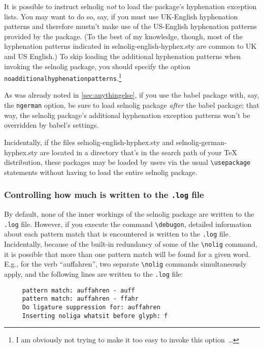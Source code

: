\documentclass[12pt]{article}
\newcommand{\pkg}[1]{\textsf{#1}}
\newcommand{\opt}[1]{\texttt{#1}}
\newcommand{\cmmd}[1]{\texttt{\textbackslash #1}}
\begin{document}
It is possible to instruct \pkg{selnolig} \emph{not} to load the package's hyphenation exception lists. You may want to do so, say, if you must use UK-English hyphenation patterns and therefore mustn't make use of the US-English hyphenation patterns provided by the package. (To the best of my knowledge, though, most of the hyphenation patterns indicated in \pkg{selnolig-english-hyphex.sty} are common to UK and US English.) To skip loading the additional hyphenation patterns when invoking the \pkg{selnolig} package, you should specify the option \opt{noadditional\-hyphen\-a\-tion\-patterns}.\footnote{I am obviously not trying to make it too easy to invoke this option~\dots}

As was already noted in \cref{sec:anythingelse}, if you use the \pkg{babel} package with, say, the \opt{ngerman} option, be sure to load \pkg{selnolig} package \emph{after} the \pkg{babel} package; that way, the \pkg{selnolig} package's additional hyphenation exception patterns won't be overridden by \pkg{babel}'s settings.

Incidentally, if the files \pkg{selnolig-english-hyphex.sty} and \pkg{selnolig-german-hyphex.sty} are located in a directory that's in the search path of your TeX distribution, these packages may be loaded by users via the usual \cmmd{usepackage} statements without having to load the entire \pkg{selnolig} package.


\subsubsection[Controlling how much is written to the \opt{.log} file]{Controlling how much is written to the \opt{.log} file} \label{sec:debugon}

By default, none of the inner workings of the \pkg{selnolig} package are written to the \opt{.log} file. However, if you execute the command \cmmd{debugon}, detailed information about each pattern match that is encountered is written to the \opt{.log} file. Incidentally, because of the built-in redundancy of some of the \cmmd{nolig} command, it is possible that more than one pattern match will be found for a given word. E.g., for the verb \enquote{auffahren}, two separate \cmmd{nolig} commands simultaneously apply, and the following lines are written to the \opt{.log} file:
\begin{Verbatim}
     pattern match: auffahren - auff
     pattern match: auffahren - ffahr
     Do ligature suppression for: auffahren
     Inserting noliga whatsit before glyph: f
\end{Verbatim}
\end{document}

